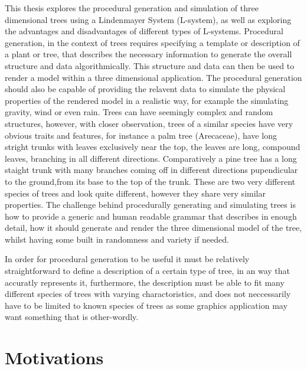 \begin{flushleft}

This thesis explores the procedural generation and simulation of three dimensional trees using a Lindenmayer System (L-system), as well as exploring the advantages and disadvantages of different types of L-systems. Procedural generation, in the context of  trees requires specifying a template or description of a plant or tree, that describes the necessary information to generate the overall structure and data algorithmically. This structure and data can then be used to render a model within a three dimensional application. The procedural generation should also be capable of providing the relavent data to simulate the physical properties of the rendered model in a realistic way, for example the simulating gravity, wind or even rain. Trees can have seemingly complex and random structures, however, with closer observation, trees of a similar species have very obvious traits and features, for instance a palm tree (Arecaceae), have long stright trunks with leaves exclusively near the top, the leaves are long, compound leaves, branching in all different directions. Comparatively a pine tree has a long staight trunk with many branches coming off in different directions pupendicular to the ground,from its base to the top of the trunk. These are two very different species of trees and look quite different, however they share very similar properties. The challenge behind procedurally generating and simulating trees is how to provide a generic and human readable grammar that describes in enough detail, how it should generate and render the three dimensional model of the tree, whilst having some built in randomness and variety if needed.  

In order for procedural generation to be useful it must be relatively straightforward to define a description of a certain type of tree, in an way that accuratly represents it, furthermore, the description must be able to fit many different species of trees with varying charactoristics, and does not neccessarily have to be limited to known species of trees as some graphics application may want something that is other-wordly.




\end{flushleft}

\section{Motivations}
 
